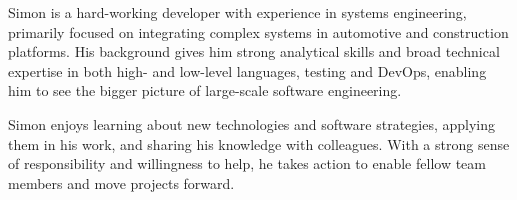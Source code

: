 
% 
\begin{cvparagraph}
  Simon is a hard-working developer with experience in systems engineering, primarily focused on integrating complex systems in automotive and construction platforms. His background gives him strong analytical skills and broad technical expertise in both high- and low-level languages, testing and DevOps, enabling him to see the bigger picture of large-scale software engineering.
\end{cvparagraph}

\begin{cvparagraph}
  Simon enjoys learning about new technologies and software strategies, applying them in his work, and sharing his knowledge with colleagues. With a strong sense of responsibility and willingness to help, he takes action to enable fellow team members and move projects forward.
\end{cvparagraph}
